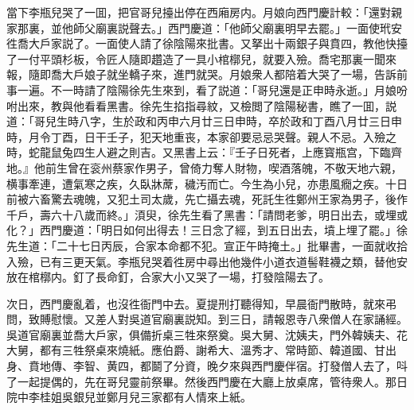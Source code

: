 當下李瓶兒哭了一囬，把官哥兒擡出停在西廂房内。月娘向西門慶計較：「還對親家那裏，並他師父廟裏説聲去。」西門慶道：「他師父廟裏明早去罷。」一面使玳安徃喬大戶家説了。一面使人請了徐陰陽來批書。又拏出十兩銀子與賁四，教他快擡了一付平頭杉板，令匠人隨即趲造了一具小棺槨兒，就要入殮。喬宅那裏一聞來報，隨即喬大戶娘子就坐轎子來，進門就哭。月娘衆人都陪着大哭了一場，告訴前事一遍。不一時請了陰陽徐先生來到，看了説道：「哥兒還是正申時永逝。」月娘吩咐出來，教與他看看黑書。徐先生掐指尋紋，又檢閲了陰陽秘書，瞧了一囬，説道：「哥兒生時八字，生於政和丙申六月廿三日申時，卒於政和丁酉八月廿三日申時，月令丁酉，日干壬子，犯天地重丧，本家卻要忌忌哭聲。親人不忌。入殮之時，蛇龍鼠兔四生人避之則吉。又黑書上云：『壬子日死者，上應寳瓶宫，下臨齊地。』他前生曾在衮州蔡家作男子，曾倚力奪人財物，喫酒落魄，不敬天地六親，横事牽連，遭氣寒之疾，久臥牀蓆，穢汚而亡。今生為小兒，亦患風癇之疾。十日前被六畜驚去魂魄，又犯土司太歲，先亡攝去魂，死託生徃鄭州王家為男子，後作千戶，壽六十八歲而終。」湏臾，徐先生看了黑書：「請問老爹，明日出去，或埋或化？」西門慶道：「明日如何出得去！三日念了經，到五日出去，墳上埋了罷。」徐先生道：「二十七日丙辰，合家本命都不犯。宣正午時掩土。」批畢書，一面就收拾入殮，已有三更天氣。李瓶兒哭着徃房中尋出他幾件小道衣道髻鞋襪之類，替他安放在棺槨内。釘了長命釘，合家大小又哭了一場，打發陰陽去了。

次日，西門慶亂着，也沒徃衙門中去。夏提刑打聽得知，早晨衙門散時，就來弔問，致賻慰懷。又差人對吳道官廟裏説知。到三日，請報恩寺八衆僧人在家誦經。吳道官廟裏並喬大戶家，俱備折桌三牲來祭奠。吳大舅、沈姨夫，門外韓姨夫、花大舅，都有三牲祭桌來燒紙。應伯爵、謝希大、溫秀才、常時節、韓道國、甘出身、賁地傳、李智、黄四，都鬬了分資，晚夕來與西門慶伴宿。打發僧人去了，呌了一起提偶的，先在哥兒靈前祭畢。然後西門慶在大廳上放桌席，管待衆人。那日院中李桂姐吳銀兒並鄭月兒三家都有人情來上紙。

